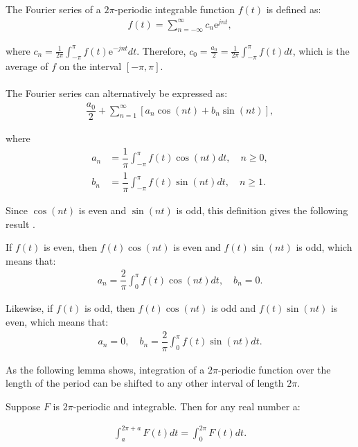 \begin{definition} \label{def:fourier_definition}
The Fourier series of a $2\pi$-periodic integrable function $f(t)$ is defined as:
\begin{align*}
	f(t) = \sum_{n=-\infty}^\infty c_n \text{e}^{j n t},
\end{align*}

where $c_n = \frac{1}{2\pi}\int_{- \pi}^\pi f(t) \text{e}^{-j n t} dt$. Therefore, $c_0 = \frac{a_0}{2} = \frac{1}{2\pi} \int_{-\pi}^\pi f(t) dt$, which is the average of $f$ on the interval $[-\pi,\pi]$.
\\ \\
The Fourier series can alternatively be expressed as:
\begin{align*}
	\dfrac{a_0}{2} + \sum_{n=1}^{\infty} \left[ a_n \cos(n t) + 	b_n \sin(n t)\right],
\end{align*}

where
\begin{align*}
	a_n 
	&= \dfrac{1}{\pi} \int_{-\pi}^\pi f(t) \cos (n t) dt, \quad 	n \geq 0, \\
	b_n
	&= \dfrac{1}{\pi} \int_{-\pi}^\pi f(t) \sin (n t) dt, \quad 	n \geq 1.
\end{align*}
\end{definition}

Since $\cos(nt)$ is even and $\sin(nt)$ is odd, this definition gives the following result \cite{page 21, FAA}.

\begin{lemma}
If $f(t)$ is even, then $f(t)\cos(nt)$ is even and $f(t)\sin(nt)$ is odd, which means that:
\begin{align*}
a_n = \dfrac{2}{\pi} \int_0^\pi f(t) \cos(nt) dt, \quad b_n = 0.
\end{align*}

Likewise, if $f(t)$ is odd, then $f(t)\cos(nt)$ is odd and $f(t)\sin(nt)$ is even, which means that:
\begin{align*}
a_n = 0, \quad b_n = \dfrac{2}{\pi} \int_0^\pi f(t) \sin(nt) dt.
\end{align*}
\end{lemma}

As the following lemma shows, integration of a $2\pi$-periodic function over the length of the period can be shifted to any other interval of length $2\pi$.

\begin{lemma}\label{lemma:2pi-periodic_function}
Suppose $F$ is $2\pi$-periodic and integrable. Then for any real number a:

\begin{align}
\int_a^{2\pi+a}F(t) dt = \int_0^{2\pi}F(t)dt.
\end{align}
\end{lemma}

